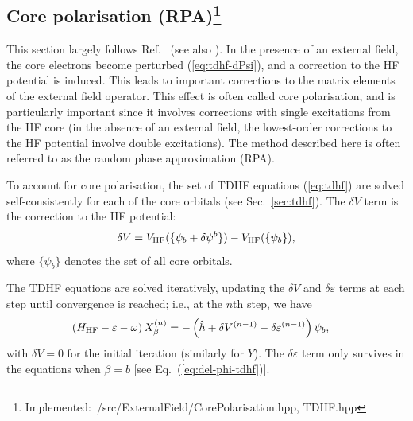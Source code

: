 \documentclass[10pt,twocolumn,a4paper]{article}%
\newcommand{\be}{\begin{equation}}
\newcommand{\ee}{\end{equation}}
\def\en{\ensuremath{\varepsilon}}
\renewcommand{\b}{\ensuremath{\beta}}
\newcommand{\w}{\ensuremath{\omega}}
\begin{document}




\subsection[Core polarisation (RPA)]{Core polarisation (RPA)\footnote{Implemented:~/src/ExternalField/CorePolarisation.hpp, TDHF.hpp}\label{sec:RPA}}

This section largely follows Ref.~\cite{DzubaHFS1984} (see also \cite{Dzuba2018a,Manakov1986,Johnson1980,Johnson1989}).
In the presence of an external field, the core electrons become perturbed (\ref{eq:tdhf-dPsi}), and a correction to the HF potential is induced.
This leads to important corrections to the matrix elements of the external field operator.
This effect is often called core polarisation, and is particularly important since it involves corrections with single excitations from the HF core (in the absence of an external field, the lowest-order corrections to the HF potential involve double excitations).
The method described here is often referred to as the random phase approximation (RPA).


To account for core polarisation, the set of TDHF equations (\ref{eq:tdhf}) are solved self-consistently for each of the core orbitals (see Sec.~\ref{sec:tdhf}).
%
The $\delta V$ term is the correction to the HF potential: 
\be\label{eq:delV-simple}
\delta V = V_{\rm HF}(\{\psi_b + \delta\psi^b\}) - V_{\rm HF}(\{\psi_b\}),
\ee
where $\{\psi_b\}$ denotes the set of all core orbitals.

The TDHF equations are solved iteratively, updating the $\delta V$ and $\delta \en$  terms at each step
until convergence is reached; i.e., at the $n$th step, we have
\begin{equation}\begin{split}
\label{eq:tdhf-rpa}
\left( H_{\rm HF} - \en -\w \right)X_\beta^{(n)} &= -\left(\hat h + \delta V^{(n-1)} - \delta \en^{(n-1)} \right)\psi_b,
\end{split}\end{equation}
with $\delta V=0$ for the initial iteration (similarly for $Y$).
The $\delta\en$ term only survives in the equations when $\b=b$ [see Eq.~(\ref{eq:del-phi-tdhf})].
\end{document}
